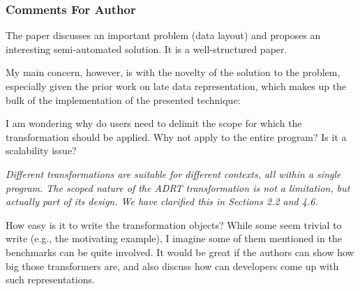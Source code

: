 \documentclass[9pt]{article}
\newenvironment{packed_item}{
\begin{itemize}
  \setlength{\itemsep}{1pt}
  \setlength{\parskip}{0.2pt}
  \setlength{\parsep}{0.2pt}
}{
  \end{itemize}
}
\newenvironment{reviewer}
{ \color{Red} \framebox{{\bf FEEDBACK}} }
{  }
\newenvironment{reviewer-addr}
{ \color{OliveGreen} \framebox{{\bf FEEDBACK}} }
{  }
\newenvironment{answer}
{ \em \framebox{{\bf AUTHOR RESPONSE}} }
{  }
\begin{document}
\subsubsection{Comments For Author}

The paper discusses an important problem (data layout) and proposes an interesting semi-automated solution. It is a well-structured paper.

\vspace{5mm}

My main concern, however, is with the novelty of the solution to the problem, especially given the prior work on late data representation, which makes up the bulk of the implementation of the presented technique:

\begin{reviewer-addr}
\begin{packed_item}
\item I am wondering why do users need to delimit the scope for which the transformation should be applied. Why not apply to the entire program? Is it a scalability issue?
\end{packed_item}
\end{reviewer-addr}

\begin{answer}
Different transformations are suitable for different contexts, all within a single program. The scoped nature of the ADRT transformation is not a limitation, but actually part of its design. We have clarified this in Sections 2.2 and 4.6.
\end{answer}

\vspace{5mm}

\begin{reviewer}
\begin{packed_item}
\item How easy is it to write the transformation objects? While some
seem trivial to write (e.g., the motivating example), I imagine some of them
mentioned in the benchmarks can be quite involved. It would be great if the
authors can show how big those transformers are, and also discuss how can
developers come up with such representations.
\end{packed_item}
\end{reviewer}
\end{document}
